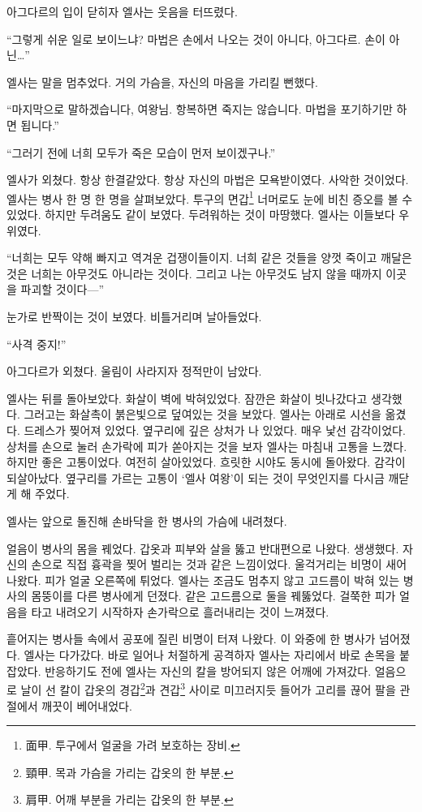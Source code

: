 아그다르의 입이 닫히자 엘사는 웃음을 터뜨렸다.

``그렇게 쉬운 일로 보이느냐? 마법은 손에서 나오는 것이 아니다, 아그다르. 손이 아닌\ldots''

엘사는 말을 멈추었다. 거의 가슴을, 자신의 마음을 가리킬 뻔했다.

``마지막으로 말하겠습니다, 여왕님. 항복하면 죽지는 않습니다. 마법을 포기하기만 하면 됩니다.''

``그러기 전에 너희 모두가 죽은 모습이 먼저 보이겠구나.''

엘사가 외쳤다. 항상 한결같았다. 항상 자신의 마법은 모욕받이였다. 사악한 것이었다. 엘사는 병사 한 명 한 명을 살펴보았다. 투구의 면갑\footnote{面甲. 투구에서 얼굴을 가려 보호하는 장비.} 너머로도 눈에 비친 증오를 볼 수 있었다. 하지만 두려움도 같이 보였다. 두려워하는 것이 마땅했다. 엘사는 이들보다 우위였다.

``너희는 모두 약해 빠지고 역겨운 겁쟁이들이지. 너희 같은 것들을 양껏 죽이고 깨달은 것은 너희는 아무것도 아니라는 것이다. 그리고 나는 아무것도 남지 않을 때까지 이곳을 파괴할 것이다—''

눈가로 반짝이는 것이 보였다. 비틀거리며 날아들었다.

``사격 중지!''

아그다르가 외쳤다. 울림이 사라지자 정적만이 남았다.

엘사는 뒤를 돌아보았다. 화살이 벽에 박혀있었다. 잠깐은 화살이 빗나갔다고 생각했다. 그러고는 화살촉이 붉은빛으로 덮여있는 것을 보았다. 엘사는 아래로 시선을 옮겼다. 드레스가 찢어져 있었다. 옆구리에 깊은 상처가 나 있었다. 매우 낯선 감각이었다. 상처를 손으로 눌러 손가락에 피가 쏟아지는 것을 보자 엘사는 마침내 고통을 느꼈다. 하지만 좋은 고통이었다. 여전히 살아있었다. 흐릿한 시야도 동시에 돌아왔다. 감각이 되살아났다. 옆구리를 가르는 고통이 `엘사 여왕'이 되는 것이 무엇인지를 다시금 깨닫게 해 주었다.

엘사는 앞으로 돌진해 손바닥을 한 병사의 가슴에 내려쳤다.

얼음이 병사의 몸을 꿰었다. 갑옷과 피부와 살을 뚫고 반대편으로 나왔다. 생생했다. 자신의 손으로 직접 흉곽을 찢어 벌리는 것과 같은 느낌이었다. 울걱거리는 비명이 새어 나왔다. 피가 얼굴 오른쪽에 튀었다. 엘사는 조금도 멈추지 않고 고드름이 박혀 있는 병사의 몸뚱이를 다른 병사에게 던졌다. 같은 고드름으로 둘을 꿰뚫었다. 걸쭉한 피가 얼음을 타고 내려오기 시작하자 손가락으로 흘러내리는 것이 느껴졌다.

흩어지는 병사들 속에서 공포에 질린 비명이 터져 나왔다. 이 와중에 한 병사가 넘어졌다. 엘사는 다가갔다. 바로 일어나 처절하게 공격하자 엘사는 자리에서 바로 손목을 붙잡았다. 반응하기도 전에 엘사는 자신의 칼을 방어되지 않은 어깨에 가져갔다. 얼음으로 날이 선 칼이 갑옷의 경갑\footnote{頸甲. 목과 가슴을 가리는 갑옷의 한 부분.}과 견갑\footnote{肩甲. 어깨 부분을 가리는 갑옷의 한 부분.} 사이로 미끄러지듯 들어가 고리를 끊어 팔을 관절에서 깨끗이 베어내었다.

